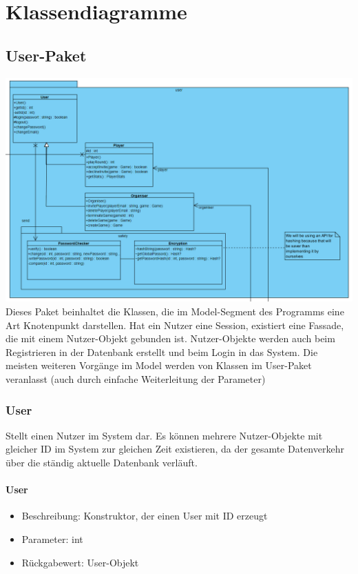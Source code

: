 \documentclass[a4paper]{scrreprt}
\begin{document}
	\chapter{Klassendiagramme}

	\section{User-Paket}
	\includegraphics[width=\textwidth]{img/user.png}
	Dieses Paket beinhaltet die Klassen, die im Model-Segment des Programms eine Art Knotenpunkt darstellen. Hat ein Nutzer eine Session, existiert
	eine Fassade, die mit einem Nutzer-Objekt gebunden ist. Nutzer-Objekte werden auch beim Registrieren in der Datenbank erstellt und beim Login
	in das System. Die meisten weiteren Vorgänge im Model werden von Klassen im User-Paket veranlasst (auch durch einfache Weiterleitung der Parameter)
	\subsection{User}
	Stellt einen Nutzer im System dar. Es können mehrere Nutzer-Objekte mit gleicher ID im System zur gleichen Zeit existieren, da der gesamte Datenverkehr über die ständig aktuelle Datenbank verläuft.
	\subsubsection{User}
	\begin{itemize}
		\item Beschreibung: Konstruktor, der einen User mit ID erzeugt
		\item Parameter: int
		\item Rückgabewert: User-Objekt
	\end{itemize}
\end{document}
